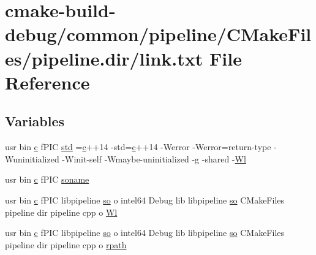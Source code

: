 \hypertarget{common_2pipeline_2CMakeFiles_2pipeline_8dir_2link_8txt}{}\section{cmake-\/build-\/debug/common/pipeline/\+C\+Make\+Files/pipeline.dir/link.txt File Reference}
\label{common_2pipeline_2CMakeFiles_2pipeline_8dir_2link_8txt}
\subsection*{Variables}
\begin{DoxyCompactItemize}
\item 
usr bin \hyperlink{CMakeCache_8txt_aac1d6a1710812201527c735f7c6afbaa}{c} f\+P\+IC \hyperlink{common_2pipeline_2CMakeFiles_2pipeline_8dir_2link_8txt_a5f87c8f8e33670f7c8c5221b6be1bcc4}{std} =\hyperlink{CMakeCache_8txt_aac1d6a1710812201527c735f7c6afbaa}{c}++14 -\/std=\hyperlink{CMakeCache_8txt_aac1d6a1710812201527c735f7c6afbaa}{c}++14 -\/Werror -\/Werror=return-\/type -\/Wuninitialized -\/Winit-\/self -\/Wmaybe-\/uninitialized -\/g -\/shared -\/\hyperlink{thirdparty_2extension_2CMakeFiles_2cpu__extension_8dir_2link_8txt_af9ccbf658ed2deb89d0d79f211e5b033}{Wl}
\item 
usr bin \hyperlink{CMakeCache_8txt_aac1d6a1710812201527c735f7c6afbaa}{c} f\+P\+IC \hyperlink{common_2pipeline_2CMakeFiles_2pipeline_8dir_2link_8txt_ab65a9b6457c4853ed17f89f945516e66}{soname}
\item 
usr bin \hyperlink{CMakeCache_8txt_aac1d6a1710812201527c735f7c6afbaa}{c} f\+P\+IC libpipeline \hyperlink{CMakeCache_8txt_aa98797039f48d335ee715de4cd92852f}{so} o intel64 Debug lib libpipeline \hyperlink{CMakeCache_8txt_aa98797039f48d335ee715de4cd92852f}{so} C\+Make\+Files pipeline dir pipeline cpp o \hyperlink{common_2pipeline_2CMakeFiles_2pipeline_8dir_2link_8txt_a8c57c9970d8ceee9abbea620f9401d1e}{Wl}
\item 
usr bin \hyperlink{CMakeCache_8txt_aac1d6a1710812201527c735f7c6afbaa}{c} f\+P\+IC libpipeline \hyperlink{CMakeCache_8txt_aa98797039f48d335ee715de4cd92852f}{so} o intel64 Debug lib libpipeline \hyperlink{CMakeCache_8txt_aa98797039f48d335ee715de4cd92852f}{so} C\+Make\+Files pipeline dir pipeline cpp o \hyperlink{common_2pipeline_2CMakeFiles_2pipeline_8dir_2link_8txt_a854131ad1613703e932d1edc2e2cde7a}{rpath}
\end{DoxyCompactItemize}



